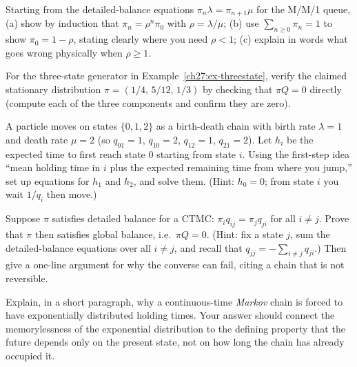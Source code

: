 \begin{exercise}
\label{ch27:exr-derive-geom}
Starting from the detailed-balance equations $\pi_n \lambda = \pi_{n+1}\mu$ for the M/M/1 queue,
(a) show by induction that $\pi_n = \rho^n \pi_0$ with $\rho = \lambda/\mu$; (b) use
$\sum_{n\ge0}\pi_n = 1$ to show $\pi_0 = 1 - \rho$, stating clearly where you need $\rho < 1$;
(c) explain in words what goes wrong physically when $\rho \ge 1$.
\end{exercise}

\begin{exercise}
\label{ch27:exr-global}
For the three-state generator in Example~\ref{ch27:ex-threestate}, verify the claimed stationary
distribution $\pi = (1/4,\,5/12,\,1/3)$ by checking that $\pi Q = 0$ directly (compute each of the
three components and confirm they are zero).
\end{exercise}

\begin{exercise}
\label{ch27:exr-hitting}
A particle moves on states $\{0,1,2\}$ as a birth-death chain with birth rate $\lambda = 1$ and death
rate $\mu = 2$ (so $q_{01}=1$, $q_{10}=2$, $q_{12}=1$, $q_{21}=2$). Let $h_i$ be the expected time to
first reach state $0$ starting from state $i$. Using the first-step idea ``mean holding time in $i$
plus the expected remaining time from where you jump,'' set up equations for $h_1$ and $h_2$, and
solve them. (Hint: $h_0 = 0$; from state $i$ you wait $1/q_i$ then move.)
\end{exercise}

\begin{exercise}
\label{ch27:exr-proof-balance}
Suppose $\pi$ satisfies detailed balance for a CTMC: $\pi_i q_{ij} = \pi_j q_{ji}$ for all
$i \ne j$. Prove that $\pi$ then satisfies global balance, i.e.\ $\pi Q = 0$. (Hint: fix a state $j$,
sum the detailed-balance equations over all $i \ne j$, and recall that $q_{jj} = -\sum_{i\ne j}
q_{ji}$.) Then give a one-line argument for why the converse can fail, citing a chain that is not
reversible.
\end{exercise}

\begin{exercise}
\label{ch27:exr-why-exp}
Explain, in a short paragraph, why a continuous-time \emph{Markov} chain is forced to have
exponentially distributed holding times. Your answer should connect the memorylessness of the
exponential distribution to the defining property that the future depends only on the present state,
not on how long the chain has already occupied it.
\end{exercise}


